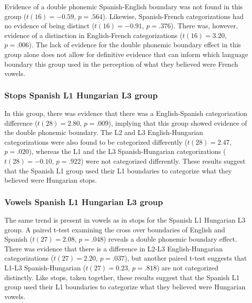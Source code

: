 \documentclass[
  english,
  man]{apa6}
\begin{document}
Evidence of a double phonemic Spanish-English boundary was not found in this group (\(t(16) = -0.59\), \(p = .564\)). Likewise, Spanish-French categorizations had no evidence of being distinct (\(t(16) = -0.91\), \(p = .376\)). There was, however, evidence of a distinction in English-French categorizations (\(t(16) = 3.20\), \(p = .006\)). The lack of evidence for the double phonemic boundary effect in this group alone does not allow for definitive evidence that can inform which language boundary this group used in the perception of what they believed were French vowels.

\hypertarget{stops-spanish-l1-hungarian-l3-group}{%
\subsubsection{Stops Spanish L1 Hungarian L3 group}\label{stops-spanish-l1-hungarian-l3-group}}

In this group, there was evidence that there was a English-Spanish categorization difference (\(t(28) = 2.80\), \(p = .009\)), implying that this group showed evidence of the double phonemic boundary. The L2 and L3 English-Hungarian categorizations were also found to be categorized differently (\(t(28) = 2.47\), \(p = .020\)), whereas the L1 and the L3 Spanish-Hungarian categorizations (\(t(28) = -0.10\), \(p = .922\)) were not categorized differently.
These results suggest that the Spanish L1 group used their L1 boundaries to categorize what they believed were Hungarian stops.

\hypertarget{vowels-spanish-l1-hungarian-l3-group}{%
\subsubsection{Vowels Spanish L1 Hungarian L3 group}\label{vowels-spanish-l1-hungarian-l3-group}}

The same trend is present in vowels as in stops for the Spanish L1 Hungarian L3 group. A paired t-test examining the cross over boundaries of English and Spanish (\(t(27) = 2.08\), \(p = .048\)) reveals a double phonemic boundary effect. There was evidence that there is a difference in L2-L3 English-Hungarian categorizations (\(t(27) = 2.20\), \(p = .037\)), but another paired t-test suggests that L1-L3 Spanish-Hungarian (\(t(27) = 0.23\), \(p = .818\)) are not categorized distinctly. Like stops, taken together, these results suggest that the Spanish L1 group used their L1 boundaries to categorize what they believed were Hungarian vowels.
\end{document}
